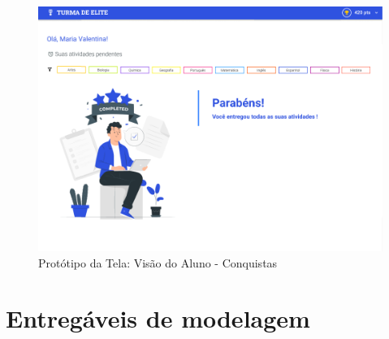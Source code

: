 \documentclass[
    12pt,               %
    openright,          %
    oneside,
    a4paper,            %
    english,            %
    brazil              %
    ]{ifsp-spo-inf-ctds} %
\begin{document}
\begin{apendicesenv}
\begin{figure}[htb]
    \centering
	\includegraphics[width=16cm]{imagens/Aluno-Conquista.png}
	\caption{\label{fig:conquista} Protótipo da Tela: Visão do Aluno - Conquistas}
\end{figure}
\FloatBarrier

\chapter{Entregáveis de modelagem}

\end{apendicesenv}
\end{document}
